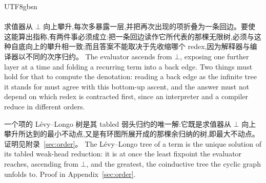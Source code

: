 \begin{CJK*}{UTF8}{gbsn}
  \paragraph{}
  \ifTablambdaChinese
  求值器从 $\bot$ 向上攀升,每次多暴露一层,并把再次出现的项折叠为一条回边。要使这能算出指称,有两件事必须成立:把一条回边读作它所代表的那棵无限树,必须与这种自底向上的攀升相一致;而且答案不能取决于先收缩哪个 redex,因为解释器与编译器以不同的次序归约。
  \else
  The evaluator ascends from $\bot$, exposing one further layer at a time and folding a recurring term into a back edge. Two things must hold for that to compute the denotation: reading a back edge as the infinite tree it stands for must agree with this bottom-up ascent, and the answer must not depend on which redex is contracted first, since an interpreter and a compiler reduce in different orders.
  \fi

  \begin{theorem}\label{thm:unique}
    \ifTablambdaChinese
    一个项的 Lévy--Longo 树是其 tabled 弱头归约的唯一解:它既是求值器从 $\bot$ 向上攀升所达到的最小不动点,又是有环图所展开成的那棵余归纳的树,即最大不动点。证明见附录~\ref{sec:order}。
    \else
    The L\'evy--Longo tree of a term is the unique solution of its tabled weak-head reduction: it is at once the least fixpoint the evaluator reaches, ascending from $\bot$, and the greatest, the coinductive tree the cyclic graph unfolds to. Proof in Appendix~\ref{sec:order}.
    \fi
  \end{theorem}


\end{CJK*}
